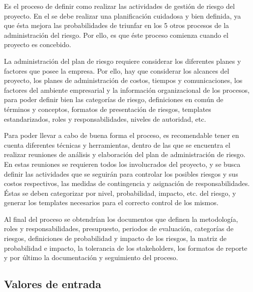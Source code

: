 
Es el proceso de definir como realizar las actividades de gestión de riesgo del proyecto.
En el se debe realizar una planificación cuidadosa y bien definida, ya que
ésta mejora las probabilidades de triunfar en los 5 otros procesos de la
administración del riesgo. Por ello, es que éste proceso comienza cuando el proyecto es concebido.

La administración del plan de riesgo requiere considerar los diferentes planes
y factores que posee la empresa. Por ello, hay que considerar los alcances del
proyecto, los planes de administración de costos, tiempos y comunicaciones,
los factores del ambiente empresarial y la información organizacional de los
procesos, para poder definir bien las categorías de riesgo, definiciones en
común de términos y conceptos, formatos de presentación de riesgos, templates
estandarizados, roles y responsabilidades, niveles de autoridad, etc.

Para poder llevar a cabo de buena forma el proceso, es recomendable tener en
cuenta diferentes técnicas y herramientas, dentro de las que se encuentra el
realizar reuniones de análisis y elaboración del plan de administración de
riesgo. En estas reuniones se requieren todos los involucrados del proyecto, y
se busca definir las actividades que se seguirán para controlar los posibles
riesgos y sus costos respectivos, las medidas de contingencia y asignación de
responsabilidades. Éstas se deben categorizar por nivel, probabilidad,
impacto, etc. del riesgo, y generar los templates necesarios para el correcto
control de los mismos.

Al final del proceso se obtendrían los documentos que definen la metodología,
roles y responsabilidades, presupuesto, periodos de evaluación, categorías de
riesgos, definiciones de probabilidad y impacto de los riesgos, la matriz de
probabilidad e impacto, la tolerancia de los stakeholders, los formatos de
reporte y por último la documentación y seguimiento del proceso.
\subsection{Valores de entrada}


